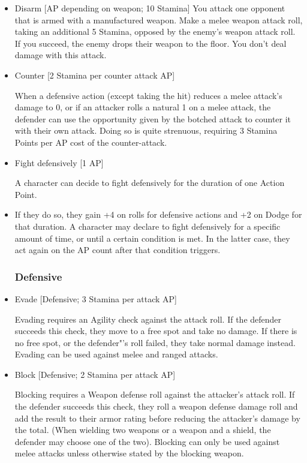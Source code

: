 \begin{itemize}
\item Disarm [AP depending on weapon; 10 Stamina]
You attack one opponent that is armed with a manufactured weapon.
Make a melee weapon attack roll, taking an additional 5 Stamina, opposed by the enemy's weapon attack roll.
If you succeed, the enemy drops their weapon to the floor.
You don't deal damage with this attack.\\


\item Counter [2 Stamina per counter attack AP]

When a defensive action (except taking the hit) reduces a melee attack's damage to 0, or if an attacker rolls a natural 1 on a melee attack, the defender can use the opportunity given by the botched attack to counter it with their own attack.
Doing so is quite strenuous, requiring 3 Stamina Points per AP cost of the counter-attack.


\item Fight defensively [1 AP]

A character can decide to fight defensively for the duration of one Action Point.

\item If they do so, they gain +4 on rolls for defensive actions and +2 on Dodge for that duration.
A character may declare to fight defensively for a specific amount of time, or until a certain condition is met.
In the latter case, they act again on the AP count after that condition triggers.

\subsubsection{Defensive}


\item Evade [Defensive; 3 Stamina per attack AP]

Evading requires an Agility check against the attack roll.
If the defender succeeds this check, they move  to a free spot and take no damage.
If there is no free spot, or the defender"'s roll failed, they take normal damage instead.
Evading can be used against melee and ranged attacks.

\item Block [Defensive; 2 Stamina per attack AP]

Blocking requires a Weapon defense roll against the attacker's attack roll.
If the defender succeeds this check, they roll a weapon defense damage roll and add the result to their armor rating before reducing the attacker's damage by the total.
(When wielding two weapons or a weapon and a shield, the defender may choose one of the two).
Blocking can only be used against melee attacks unless otherwise stated by the blocking weapon.


\end{itemize}
